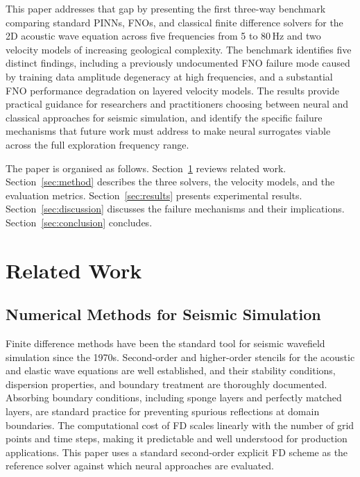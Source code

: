 \documentclass[12pt,a4paper]{article}
\begin{document}
This paper addresses that gap by presenting the first three-way
benchmark comparing standard PINNs, FNOs, and classical finite
difference solvers for the 2D acoustic wave equation across five
frequencies from 5 to 80\,Hz and two velocity models of
increasing geological complexity. The benchmark identifies five
distinct findings, including a previously undocumented FNO failure
mode caused by training data amplitude degeneracy at high
frequencies, and a substantial FNO performance degradation on
layered velocity models. The results provide practical guidance
for researchers and practitioners choosing between neural and
classical approaches for seismic simulation, and identify the
specific failure mechanisms that future work must address to make
neural surrogates viable across the full exploration frequency
range.

The paper is organised as follows. Section~\ref{sec:related}
reviews related work. Section~\ref{sec:method} describes the
three solvers, the velocity models, and the evaluation metrics.
Section~\ref{sec:results} presents experimental results.
Section~\ref{sec:discussion} discusses the failure mechanisms
and their implications. Section~\ref{sec:conclusion} concludes.

\section{Related Work}
\label{sec:related}

\subsection{Numerical Methods for Seismic Simulation}

Finite difference methods have been the standard tool for seismic
wavefield simulation since the 1970s. Second-order and
higher-order stencils for the acoustic and elastic wave equations
are well established, and their stability conditions, dispersion
properties, and boundary treatment are thoroughly documented.
Absorbing boundary conditions, including sponge layers and
perfectly matched layers, are standard practice for preventing
spurious reflections at domain boundaries. The computational cost
of FD scales linearly with the number of grid points and time
steps, making it predictable and well understood for production
applications. This paper uses a standard second-order explicit FD
scheme as the reference solver against which neural approaches
are evaluated.
\end{document}
